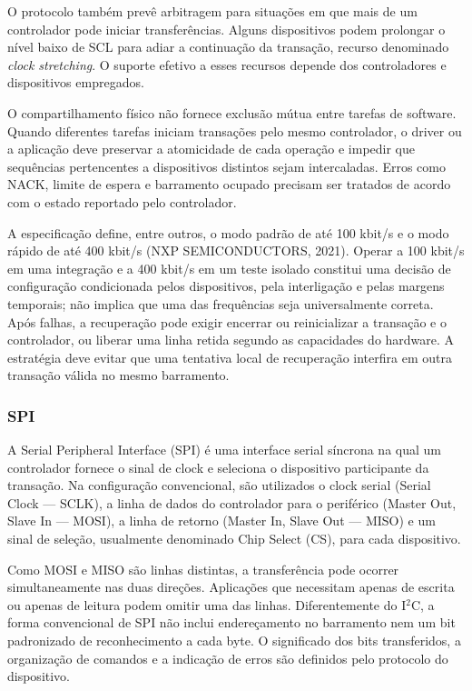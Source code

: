 \documentclass[a4paper,12pt]{article}
\begin{document}
O protocolo tamb\'em prev\^e arbitragem para situa\c{c}\~oes em que mais de um controlador pode iniciar transfer\^encias. Alguns dispositivos podem prolongar o n\'ivel baixo de SCL para adiar a continua\c{c}\~ao da transa\c{c}\~ao, recurso denominado \emph{clock stretching}. O suporte efetivo a esses recursos depende dos controladores e dispositivos empregados.


O compartilhamento f\'isico n\~ao fornece exclus\~ao m\'utua entre tarefas de software. Quando diferentes tarefas iniciam transa\c{c}\~oes pelo mesmo controlador, o driver ou a aplica\c{c}\~ao deve preservar a atomicidade de cada opera\c{c}\~ao e impedir que sequ\^encias pertencentes a dispositivos distintos sejam intercaladas. Erros como NACK, limite de espera e barramento ocupado precisam ser tratados de acordo com o estado reportado pelo controlador.


A especifica\c{c}\~ao define, entre outros, o modo padr\~ao de at\'e 100 kbit/s e o modo r\'apido de at\'e 400 kbit/s (NXP SEMICONDUCTORS, 2021). Operar a 100 kbit/s em uma integra\c{c}\~ao e a 400 kbit/s em um teste isolado constitui uma decis\~ao de configura\c{c}\~ao condicionada pelos dispositivos, pela interliga\c{c}\~ao e pelas margens temporais; n\~ao implica que uma das frequ\^encias seja universalmente correta. Ap\'os falhas, a recupera\c{c}\~ao pode exigir encerrar ou reinicializar a transa\c{c}\~ao e o controlador, ou liberar uma linha retida segundo as capacidades do hardware. A estrat\'egia deve evitar que uma tentativa local de recupera\c{c}\~ao interfira em outra transa\c{c}\~ao v\'alida no mesmo barramento.


\subsubsection{SPI}


A Serial Peripheral Interface (SPI) \'e uma interface serial s\'incrona na qual um controlador fornece o sinal de clock e seleciona o dispositivo participante da transa\c{c}\~ao. Na configura\c{c}\~ao convencional, s\~ao utilizados o clock serial (Serial Clock --- SCLK), a linha de dados do controlador para o perif\'erico (Master Out, Slave In --- MOSI), a linha de retorno (Master In, Slave Out --- MISO) e um sinal de sele\c{c}\~ao, usualmente denominado Chip Select (CS), para cada dispositivo.


Como MOSI e MISO s\~ao linhas distintas, a transfer\^encia pode ocorrer simultaneamente nas duas dire\c{c}\~oes. Aplica\c{c}\~oes que necessitam apenas de escrita ou apenas de leitura podem omitir uma das linhas. Diferentemente do I$^2$C, a forma convencional de SPI n\~ao inclui endere\c{c}amento no barramento nem um bit padronizado de reconhecimento a cada byte. O significado dos bits transferidos, a organiza\c{c}\~ao de comandos e a indica\c{c}\~ao de erros s\~ao definidos pelo protocolo do dispositivo.
\end{document}
